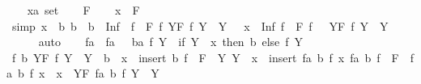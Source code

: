 \begin{isabellebody}
\ \ \isamarkupfalse%
\ x{\isacharcolon}{\kern0pt}{\isacharcolon}{\kern0pt}{\isachardoublequoteopen}{\isacharprime}{\kern0pt}a\ set{\isachardoublequoteclose}\isanewline
\ \ \isamarkupfalse%
\ F\isanewline
\ \ \isamarkupfalse%
\ {\isachardoublequoteopen}x\ {\isasymnotin}\ F{\isachardoublequoteclose}\isanewline
\ \ \isamarkupfalse%
\ {\isacharbrackleft}{\kern0pt}simp{\isacharbrackright}{\kern0pt}{\isacharcolon}{\kern0pt}\ {\isachardoublequoteopen}{\isacharbraceleft}{\kern0pt}{\isasymSqunion}x\ {\isasymsqinter}\ b\ {\isacharbar}{\kern0pt}b\ {\isachardot}{\kern0pt}\ b\ {\isasymin}\ Inf\ {\isacharbackquote}{\kern0pt}\ {\isacharbraceleft}{\kern0pt}f\ {\isacharbackquote}{\kern0pt}\ F\ {\isacharbar}{\kern0pt}f{\isachardot}{\kern0pt}\ {\isasymforall}Y{\isasymin}F{\isachardot}{\kern0pt}\ f\ Y\ {\isasymin}\ Y{\isacharbraceright}{\kern0pt}\ {\isacharbraceright}{\kern0pt}\ {\isacharequal}{\kern0pt}\ {\isacharbraceleft}{\kern0pt}{\isasymSqunion}x\ {\isasymsqinter}\ {\isacharparenleft}{\kern0pt}Inf\ {\isacharparenleft}{\kern0pt}f\ {\isacharbackquote}{\kern0pt}\ F{\isacharparenright}{\kern0pt}{\isacharparenright}{\kern0pt}\ {\isacharbar}{\kern0pt}f\ \ {\isachardot}{\kern0pt}\ {\isacharparenleft}{\kern0pt}{\isasymforall}Y{\isasymin}F{\isachardot}{\kern0pt}\ f\ Y\ {\isasymin}\ Y{\isacharparenright}{\kern0pt}{\isacharbraceright}{\kern0pt}{\isachardoublequoteclose}\isanewline
\ \ \ \ \isamarkupfalse%
\ auto\isanewline
\ \ \isamarkupfalse%
\ fa\ \ {\isachardoublequoteopen}fa\ {\isacharequal}{\kern0pt}\ {\isacharparenleft}{\kern0pt}{\isasymlambda}\ {\isacharparenleft}{\kern0pt}b{\isacharcolon}{\kern0pt}{\isacharcolon}{\kern0pt}{\isacharprime}{\kern0pt}a{\isacharparenright}{\kern0pt}\ f\ Y\ {\isachardot}{\kern0pt}\ {\isacharparenleft}{\kern0pt}if\ Y\ {\isacharequal}{\kern0pt}\ x\ then\ b\ else\ f\ Y{\isacharparenright}{\kern0pt}{\isacharparenright}{\kern0pt}{\isachardoublequoteclose}\isanewline
\ \ \isamarkupfalse%
\ {\isachardoublequoteopen}{\isasymAnd}f\ b{\isachardot}{\kern0pt}\ {\isasymforall}Y{\isasymin}F{\isachardot}{\kern0pt}\ f\ Y\ {\isasymin}\ Y\ {\isasymLongrightarrow}\ b\ {\isasymin}\ x\ {\isasymLongrightarrow}\ insert\ b\ {\isacharparenleft}{\kern0pt}f\ {\isacharbackquote}{\kern0pt}\ {\isacharparenleft}{\kern0pt}F\ {\isasyminter}\ {\isacharbraceleft}{\kern0pt}Y{\isachardot}{\kern0pt}\ Y\ {\isasymnoteq}\ x{\isacharbraceright}{\kern0pt}{\isacharparenright}{\kern0pt}{\isacharparenright}{\kern0pt}\ {\isacharequal}{\kern0pt}\ insert\ {\isacharparenleft}{\kern0pt}fa\ b\ f\ x{\isacharparenright}{\kern0pt}\ {\isacharparenleft}{\kern0pt}fa\ b\ f\ {\isacharbackquote}{\kern0pt}\ F{\isacharparenright}{\kern0pt}\ {\isasymand}\ fa\ b\ f\ x\ {\isasymin}\ x\ {\isasymand}\ {\isacharparenleft}{\kern0pt}{\isasymforall}Y{\isasymin}F{\isachardot}{\kern0pt}\ fa\ b\ f\ Y\ {\isasymin}\ Y{\isacharparenright}{\kern0pt}{\isachardoublequoteclose}\isanewline

\end{isabellebody}
